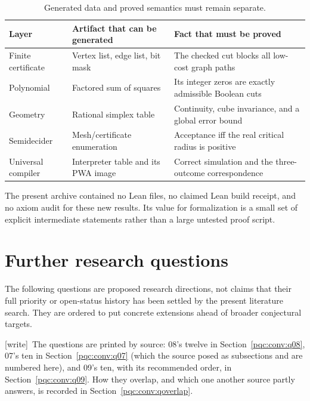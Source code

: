 \documentclass[11pt,letterpaper]{article}
\numberwithin{equation}{section}
\theoremstyle{definition}
\theoremstyle{remark}
\newcommand{\wtag}{\textup{[write]}}
\begin{document}
\begin{table}[ht]
\centering
\begin{tabularx}{\textwidth}{@{}p{}XX@{}}
\toprule
Layer & Artifact that can be generated & Fact that must be proved\\
\midrule
Finite certificate & Vertex list, edge list, bit mask & The checked cut blocks all low-cost graph paths\\
Polynomial & Factored sum of squares & Its integer zeros are exactly admissible Boolean cuts\\
Geometry & Rational simplex table & Continuity, cube invariance, and a global error bound\\
Semidecider & Mesh/certificate enumeration & Acceptance iff the real critical radius is positive\\
Universal compiler & Interpreter table and its PWA image & Correct simulation and the three-outcome correspondence\\
\bottomrule
\end{tabularx}
\caption{Generated data and proved semantics must remain separate.}
\end{table}

The present archive contained no Lean files, no claimed Lean build receipt, and
no axiom audit for these new results.  Its value for formalization is a small
set of explicit intermediate statements rather than a large untested proof
script.

\section{Further research questions}
\label{pqc:conv:questions}

The following questions are proposed research directions, not claims that
their full priority or open-status history has been settled by the present
literature search. They are ordered to put concrete extensions ahead of
broader conjectural targets.


\wtag\ The questions are printed by source: 08's twelve in
Section~\ref{pqc:conv:q08}, 07's ten in Section~\ref{pqc:conv:q07} (which
the source posed as subsections and are numbered here), and 09's ten, with
its recommended order, in Section~\ref{pqc:conv:q09}. How they overlap, and
which one another source partly answers, is recorded in
Section~\ref{pqc:conv:qoverlap}.
\end{document}
